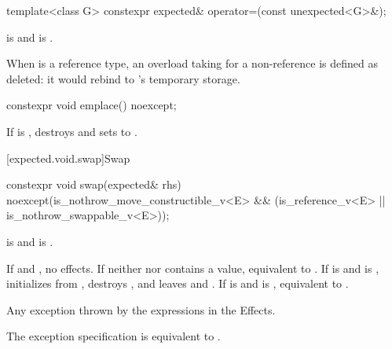 %
\begin{itemdecl}
template<class G> constexpr expected& operator=(const unexpected<G>&);
\end{itemdecl}

\begin{itemdescr}
\pnum
\constraints
{} is  and  is .

\pnum
\remarks
When  is a reference type, an overload taking  for a non-reference  is defined as deleted: it would rebind  to 's temporary storage.
\end{itemdescr}

%
\begin{itemdecl}
constexpr void emplace() noexcept;
\end{itemdecl}

\begin{itemdescr}
\pnum
\effects
If  is , destroys  and sets  to .
\end{itemdescr}

[expected.void.swap]{Swap}

%
\begin{itemdecl}
constexpr void swap(expected& rhs) noexcept(is_nothrow_move_constructible_v<E> &&
                                            (is_reference_v<E> ||
                                             is_nothrow_swappable_v<E>));
\end{itemdecl}

\begin{itemdescr}
\pnum
\constraints
{} is  and  is .

\pnum
\effects
If  and , no effects. If neither  nor  contains a value, equivalent to . If  is  and  is , initializes  from , destroys , and leaves   and  . If  is  and  is , equivalent to .

\pnum
\throws
Any exception thrown by the expressions in the Effects.

\pnum
\remarks
The exception specification is equivalent to .
\end{itemdescr}

